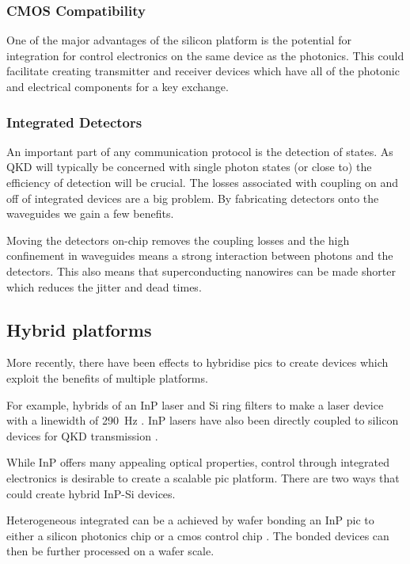 \subsubsection*{CMOS Compatibility}

One of the major advantages of the silicon platform is the potential for integration for control electronics on the same device as the photonics. This could facilitate creating transmitter and receiver devices which have all of the photonic and electrical components for a key exchange. 

\subsubsection*{Integrated Detectors}

An important part of any communication protocol is the detection of states. As \ac{QKD} will typically be concerned with single photon states (or close to) the efficiency of detection will be crucial. The losses associated with coupling on and off of integrated devices are a big problem. By fabricating detectors onto the waveguides we gain a few benefits.

Moving the detectors on-chip removes the coupling losses and the high confinement in waveguides means a strong interaction between photons and the detectors. This also means that superconducting nanowires can be made shorter which reduces the jitter and dead times.

\subsection{Hybrid platforms}

More recently, there have been effects to hybridise \acp{pic} to create devices which exploit the benefits of multiple platforms. 

For example, hybrids of an \ac{InP} laser and Si ring filters to make a laser device with a linewidth of \SI{290}{Hz} \cite{Fan2017}. \ac{InP} lasers have also been directly coupled to silicon devices for \ac{QKD} transmission \cite{Agnesi2019}.

While \ac{InP} offers many appealing optical properties, control through integrated electronics is desirable to create a scalable \ac{pic} platform. There are two ways that could create hybrid \ac{InP}-Si devices. 

Heterogeneous integrated can be a achieved by wafer bonding an \ac{InP} \ac{pic} to either a silicon photonics chip or a \ac{cmos} control chip \cite{jeppix}. The bonded devices can then be further processed on a wafer scale.

